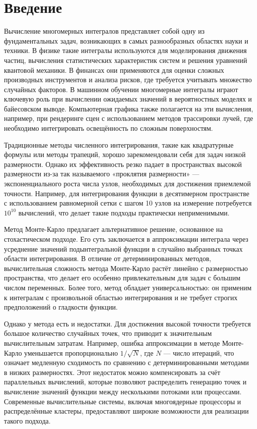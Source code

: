 \documentclass[12pt,a4paper]{extarticle}
\begin{document}
	\newpage

\tableofcontents
\newpage

\section{Введение}
Вычисление многомерных интегралов представляет собой одну из фундаментальных задач, возникающих в самых разнообразных областях науки и техники. В физике такие интегралы используются для моделирования движения частиц, вычисления статистических характеристик систем и решения уравнений квантовой механики. В финансах они применяются для оценки сложных производных инструментов и анализа рисков, где требуется учитывать множество случайных факторов. В машинном обучении многомерные интегралы играют ключевую роль при вычислении ожидаемых значений в вероятностных моделях и байесовском выводе. Компьютерная графика также полагается на эти вычисления, например, при рендеринге сцен с использованием методов трассировки лучей, где необходимо интегрировать освещённость по сложным поверхностям.

Традиционные методы численного интегрирования, такие как квадратурные формулы или методы трапеций, хорошо зарекомендовали себя для задач низкой размерности. Однако их эффективность резко падает в пространствах высокой размерности из-за так называемого «проклятия размерности» — экспоненциального роста числа узлов, необходимых для достижения приемлемой точности. Например, для интегрирования функции в десятимерном пространстве с использованием равномерной сетки с шагом 10 узлов на измерение потребуется \(10^{10}\) вычислений, что делает такие подходы практически неприменимыми.

Метод Монте-Карло предлагает альтернативное решение, основанное на стохастическом подходе. Его суть заключается в аппроксимации интеграла через усреднение значений подынтегральной функции в случайно выбранных точках области интегрирования. В отличие от детерминированных методов, вычислительная сложность метода Монте-Карло растёт линейно с размерностью пространства, что делает его особенно привлекательным для задач с большим числом переменных. Более того, метод обладает универсальностью: он применим к интегралам с произвольной областью интегрирования и не требует строгих предположений о гладкости функции.

Однако у метода есть и недостатки. Для достижения высокой точности требуется большое количество случайных точек, что приводит к значительным вычислительным затратам. Например, ошибка аппроксимации в методе Монте-Карло уменьшается пропорционально \(1/\sqrt{N}\), где \(N\) — число итераций, что означает медленную сходимость по сравнению с детерминированными методами в низких размерностях. Этот недостаток можно компенсировать за счёт параллельных вычислений, которые позволяют распределить генерацию точек и вычисление значений функции между несколькими потоками или процессами. Современные вычислительные системы, включая многоядерные процессоры и распределённые кластеры, предоставляют широкие возможности для реализации такого подхода.
\end{document}
